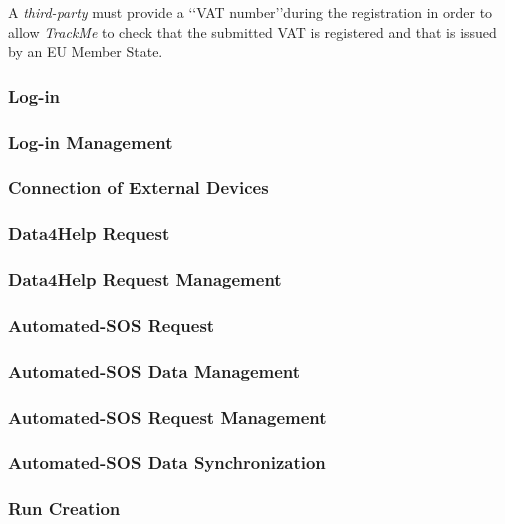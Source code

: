 \documentclass[a4paper]{article}
\begin{document}
        A \textit{third-party} must provide a \lq\lq VAT number\rq\rq during the registration in order to allow \textit{TrackMe} to check that the submitted VAT is registered and that is issued by an EU Member State.
        \subsubsection{Log-in}
         
        \subsubsection{Log-in Management}
        
        \subsubsection{Connection of External Devices}
        
        \subsubsection{Data4Help Request}
        
        \subsubsection{Data4Help Request Management}
        
        \subsubsection{Automated-SOS Request}
        
        \subsubsection{Automated-SOS Data Management}
        
        \subsubsection{Automated-SOS Request Management}
        
        \subsubsection{Automated-SOS Data Synchronization}
        
        \subsubsection{Run Creation}
        
\end{document}
